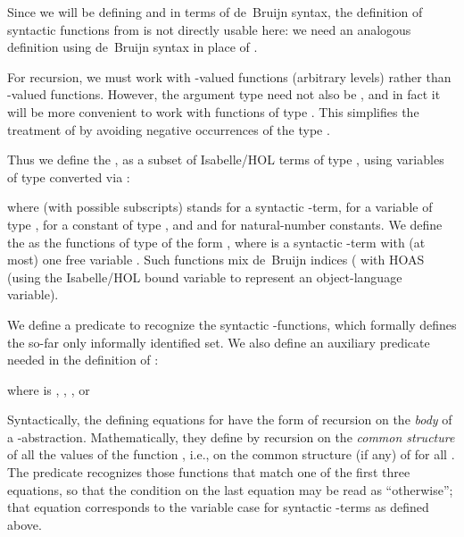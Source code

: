\documentclass[copyright,creativecommons]{eptcs}
\begin{document}
Since we will be defining  and  in terms of de~Bruijn
syntax, the definition of syntactic functions from
 is not directly usable here:
we need an analogous definition using de~Bruijn syntax in place of .

For recursion, we must work with -valued functions (arbitrary levels)
rather than -valued functions.  However, the argument type need not
also be , and in fact it will be more convenient to work with functions
of type .  This simplifies the treatment of 
by avoiding negative occurrences of the type .

Thus we define the , as a subset of
Isabelle\slash HOL terms of type , using variables of type 
converted via :
  
where  (with possible subscripts) stands for a syntactic -term,
 for a variable of type ,  for a constant of
type , and  and  for natural-number constants.
We define the  as the functions of type
 of the form , where  is
a syntactic -term with (at most) one free variable .
Such functions mix de~Bruijn indices ( with HOAS (using the
Isabelle\slash HOL bound variable  to represent an object-language
variable).

We define a predicate  to recognize the syntactic
-functions, which formally defines the so-far only
informally identified set.  We also define an auxiliary predicate
 needed in the definition of :

\begin{Defn}
\label{defn:hybrid-ordinary} \formal
\par\nopagebreak
\par\nopagebreak
\par\nopagebreak

\end{Defn}

\begin{Defn}
\label{defn:hybrid-Abstr} \formal
\par\nopagebreak

      where  is\/ , , ,
      or\/ \par\nopagebreak
\par\nopagebreak[3]
\par\nopagebreak
\par\smallskip\pagebreak[0]
\end{Defn}

Syntactically, the defining equations for  have the form of
recursion on the \emph{body} of a \hbox{-abstraction}.
Mathematically, they define  by recursion on the
\emph{common structure} of all the values of the function , i.e.,
on the common structure (if any) of  for all .
The predicate  recognizes those functions that match one of
the first three equations, so that the condition 
on the last equation may be read as ``otherwise''; that equation corresponds
to the variable case for syntactic -terms as defined above.
\end{document}
